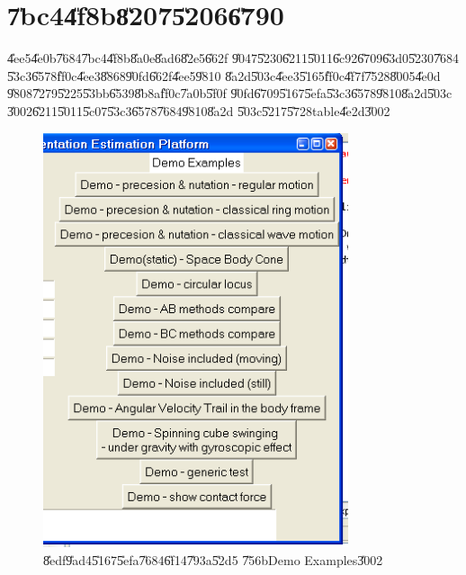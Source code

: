                       

\part{\U{7bc4}\U{4f8b}\U{8207}\U{5206}\U{6790}}

\setcounter{page}{1}

\U{4ee5}\U{4e0b}\U{7684}\U{7bc4}\U{4f8b}\U{8a0e}\U{8ad6}\U{82e5}\U{662f}%
\U{9047}\U{5230}\U{6211}\U{5011}\U{6c92}\U{6709}\U{63d0}\U{5230}\U{7684}%
\U{53c3}\U{6578}\U{ff0c}\U{4ee3}\U{8868}\U{90fd}\U{662f}\U{4ee5}\U{9810}%
\U{8a2d}\U{503c}\U{4ee3}\U{5165}\U{ff0c}\U{4f7f}\U{7528}\U{8005}\U{4e0d}%
\U{9808}\U{7279}\U{5225}\U{53bb}\U{6539}\U{8b8a}\U{ff0c}\U{7a0b}\U{5f0f}%
\U{90fd}\U{6709}\U{5167}\U{5efa}\U{53c3}\U{6578}\U{9810}\U{8a2d}\U{503c}%
\U{3002}\U{6211}\U{5011}\U{5c07}\U{53c3}\U{6578}\U{7684}\U{9810}\U{8a2d}%
\U{503c}\U{5217}\U{5728}table\U{4e2d}\U{3002}

%

\begin{figure}[th]
\caption{\U{8edf}\U{9ad4}\U{5167}\U{5efa}\U{7684}\U{6f14}\U{793a}\U{52d5}%
\U{756b}Demo Examples\U{3002}}
\label{demo_example}
\begin{center}
\includegraphics[width=0.8\textwidth]{./figs/demo_examples.png}
\end{center}
\end{figure}


